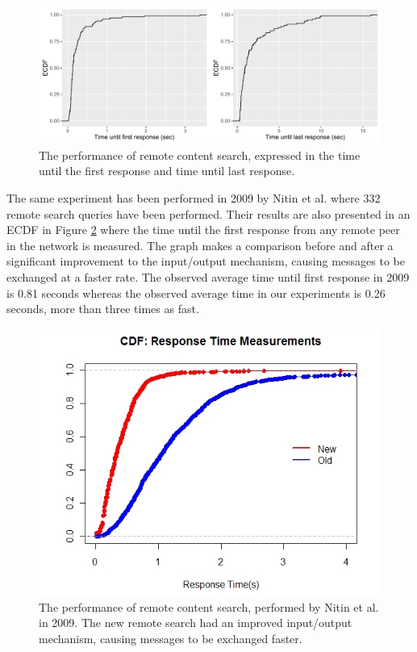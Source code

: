 \begin{figure}[!h]
	\centering
	\includegraphics[width=1.0\columnwidth]{images/experiments/cdf_remote_search}
	\caption{The performance of remote content search, expressed in the time until the first response and time until last response.}
	\label{fig:remote_search}
\end{figure}

The same experiment has been performed in 2009 by Nitin et al. where 332 remote search queries have been performed. Their results are also presented in an ECDF in Figure \ref{fig:nitin_remote_search} where the time until the first response from any remote peer in the network is measured. The graph makes a comparison before and after a significant improvement to the input/output mechanism, causing messages to be exchanged at a faster rate. The observed average time until first response in 2009 is 0.81 seconds whereas the observed average time in our experiments is 0.26 seconds, more than three times as fast.

\begin{figure}[!h]
	\centering
	\includegraphics[width=0.7\columnwidth]{images/experiments/nitin_remote_search}
	\caption{The performance of remote content search, performed by Nitin et al. in 2009. The new remote search had an improved input/output mechanism, causing messages to be exchanged faster.}
	\label{fig:nitin_remote_search}
\end{figure}

